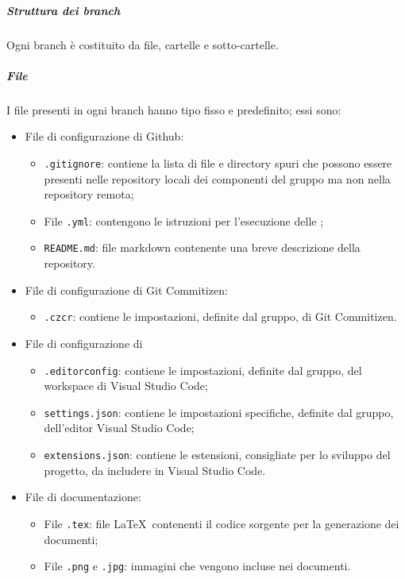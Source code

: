 \documentclass[../norme-di-progetto.tex]{subfiles}
\begin{document}
\subparagraph{Struttura dei branch}
Ogni branch è costituito da file, cartelle e sotto-cartelle.
\subparagraph*{File}
I file presenti in ogni branch hanno tipo fisso e predefinito; essi sono:
\begin{itemize}
  \item File di configurazione di Github:
  \begin{itemize}
    \item \texttt{.gitignore}: contiene la lista di file e directory spuri che possono essere presenti nelle repository locali dei componenti del gruppo ma non nella repository remota;
    \item File \texttt{.yml}: contengono le istruzioni per l'esecuzione delle ;
    \item \texttt{README.md}: file markdown contenente una breve descrizione della repository.
  \end{itemize}
  \item File di configurazione di Git Commitizen:
  \begin{itemize}
    \item \texttt{.czcr}: contiene le impostazioni, definite dal gruppo, di Git Commitizen.
  \end{itemize}
  \item File di configurazione di 
  \begin{itemize}
    \item \texttt{.editorconfig}: contiene le impostazioni, definite dal gruppo, del workspace di Visual Studio Code;
    \item \texttt{settings.json}: contiene le impostazioni specifiche, definite dal gruppo, dell'editor Visual Studio Code;
    \item \texttt{extensions.json}: contiene le estensioni, consigliate per lo sviluppo del progetto, da includere in Visual Studio Code.
  \end{itemize}
  \item File di documentazione:
  \begin{itemize}
    \item File \texttt{.tex}: file \LaTeX\ contenenti il codice sorgente per la generazione dei documenti;
    \item File \texttt{.png} e \texttt{.jpg}: immagini che vengono incluse nei documenti.
  \end{itemize}
\end{itemize}
\end{document}
